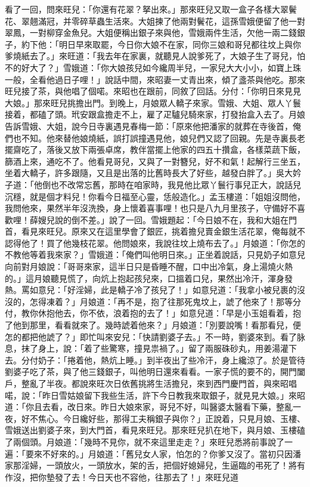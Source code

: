 \begin{showcontents}{}
看了一回，問來旺兒：「你還有花翠？拏出來。」那來旺兒又取一盒子各樣大翠鬢花、翠翹滿冠，并零碎草蟲生活來。大姐揀了他兩對鬢花，這孫雪娥便留了他一對翠鳳，一對柳穿金魚兒。大姐便稱出銀子來與他，雪娥兩件生活，欠他一兩二錢銀子，約下他：「明日早來取罷，今日你大娘不在家，同你三娘和哥兒都往坟上與你爹燒紙去了。」來旺道：「我去年在家裏，就聽見人說爹死了，大娘子生了哥兒，怕不的好大了？」雪娥道：「你大娘孩兒如今纔周半兒，一家兒大大小小，如寶上珠一般，全看他過日子哩！」說話中間，來昭妻一丈青出來，傾了盞茶與他吃。那來旺兒接了茶，與他唱了個喏。來昭也在跟前，同敘了回話。分付：「你明日來見見大娘。」那來旺兒挑擔出門。到晚上，月娘眾人轎子來家。雪娥、大姐、眾人丫鬟接着，都磕了頭。玳安跟盒擔走不上，雇了疋驢兒騎來家，打發抬盒入去了。月娘告訴雪娥、大姐，說今日寺裏遇見春梅一節：「原來他把潘家的就葬在寺後首，俺們也不知。他來替他娘燒紙，誤打誤撞遇見他，娘兒們又認了回親。先是寺裏長老擺齋吃了，落後又放下兩張卓席，教伴當擺上他家的四五十攢盒，各樣菜蔬下飯，篩酒上來，通吃不了。他看見哥兒，又與了一對簪兒，好不和氣！起解行三坐五，坐着大轎子，許多跟隨，又且是出落的比舊時長大了好些，越發白胖了。」吳大妗子道：「他倒也不改常忘舊，那時在咱家時，我見他比眾丫鬟行事兒正大，說話兒沉穩，就是個才料兒！你看今日福至心靈，恁般造化。」孟玉樓道：「姐姐沒問他，我問他來，果然半年沒洗換，身上懷着喜事哩！也只是八九月里孩子，守備好不喜歡哩！薛嫂兒說的倒不差。」說了一回。雪娥題起：「今日娘不在，我和大姐在門首，看見來旺兒。原來又在這里學會了銀匠，挑着擔兒賣金銀生活花翠，俺每就不認得他了！買了他幾枝花翠。他問娘來，我說往坟上燒布去了。」月娘道：「你怎的不教他等着我來家？」雪娥道：「俺們叫他明日來。」正坐着說話，只見奶子如意兒向前對月娘說：「哥哥來家，這半日只是昏睡不醒，口中出冷氣，身上湯燒火熱的。」這月娘聽見慌了，向炕上抱起孩兒來，口搵着口兒，果然出冷汗，渾身發熱。罵如意兒：「好淫婦，此是轎子冷了孩兒了！」如意兒道：「我拿小被兒裹的沒沒的，怎得凍着？」月娘道：「再不是，抱了往那死鬼坟上，諕了他來了！那等分付，教你休抱他去，你不依，浪着抱的去了！」如意兒道：「早是小玉姐看着，抱了他到那里，看看就來了。幾時諕着他來？」月娘道：「別要說嘴！看那看兒，便怎的都把他諕了？」即忙叫來安兒：「快請劉婆子去。」不一時，劉婆來到。看了脉息，抹了身上，說：「着了些驚寒，撞見祟禍了。」留了兩服硃砂丸，用姜湯灌下去。分付奶子：「捲着他，熱炕上睡。」到半夜出了些冷汗，身上纔涼了。於是管待劉婆子吃了茶，與了他三錢銀子，叫他明日還來看看。一家子慌的要不的，開門闔戶，整亂了半夜。都說來旺次日依舊挑將生活擔兒，來到西門慶門首，與來昭唱喏，說：「昨日雪姑娘留下我些生活，許下今日教我來取銀子，就見見大娘。」來昭道：「你且去看，改日來。昨日大娘來家，哥兒不好，叫醫婆太醫看下藥，整亂一夜，好不焦心。今日纔好些，那得工夫稱銀子與你？」正說着，只見月娘、玉樓、雪娥送出劉婆子來，到大門首，看見來旺兒。那來旺兒扒在地下，與月娘、玉樓磕了兩個頭。月娘道：「幾時不見你，就不來這里走走？」來旺兒悉將前事說了一遍：「要來不好來的。」月娘道：「舊兒女人家，怕怎的？你爹又沒了。當初只因潘家那淫婦，一頭放火，一頭放水，架的舌，把個好媳婦兒，生逼臨的弔死了！將有作沒，把你墊發了去！今日天也不容他，往那去了！」來旺兒道
\end{showcontents}
